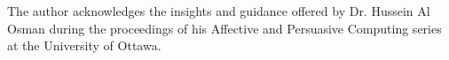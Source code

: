 \documentclass[sigplan,screen]{acmart}
\begin{document}

\maketitle







\begin{acks}
The author acknowledges the insights and guidance offered by Dr. Hussein Al Osman during the proceedings of his Affective and Persuasive Computing series at the University of Ottawa.
\end{acks}



\end{document}
